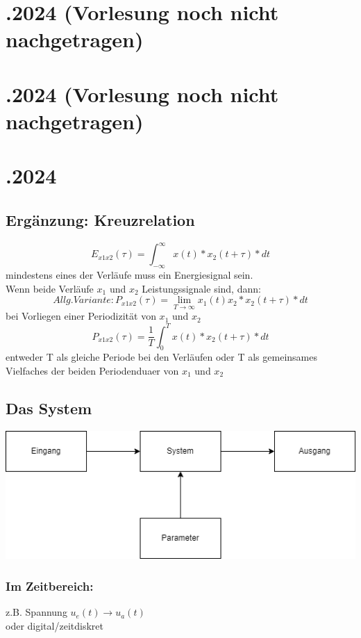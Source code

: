 \documentclass{article}
\begin{document}
\section*{.2024 (Vorlesung noch nicht nachgetragen)}
\section*{.2024 (Vorlesung noch nicht nachgetragen)}


\newpage
\section*{.2024}
\subsection*{Ergänzung: Kreuzrelation}

\[
	E_{x1x2}(\tau)=\int_{-\infty}^{\infty}x(t)*x_2(t+\tau)*dt 
\]
mindestens eines der Verläufe muss ein Energiesignal sein. \\
Wenn beide Verläufe $x_1$ und $x_2$ Leistungssignale sind, dann:
\[
	Allg. Variante: P_{x1x2}(\tau)=\lim_{T\to\infty}x_1(t)x_2*x_2(t+\tau)*dt
\]
bei Vorliegen einer Periodizität von $x_1$ und $x_2$
\[
	P_{x1x2}(\tau)=\frac{1}{T}\int_{0}^{T}x(t)*x_2(t+\tau)*dt
\]
entweder T als gleiche Periode bei den Verläufen oder T als gemeinsames Vielfaches der beiden Periodenduaer von $x_1$ und $x_2$

\subsection*{Das System}
\includegraphics[scale=0.8]{img/2024_11_11.png}

\subsubsection*{Im Zeitbereich:}
z.B. Spannung $u_e(t) \to u_a(t)$ \\
oder digital/zeitdiskret
\end{document}

